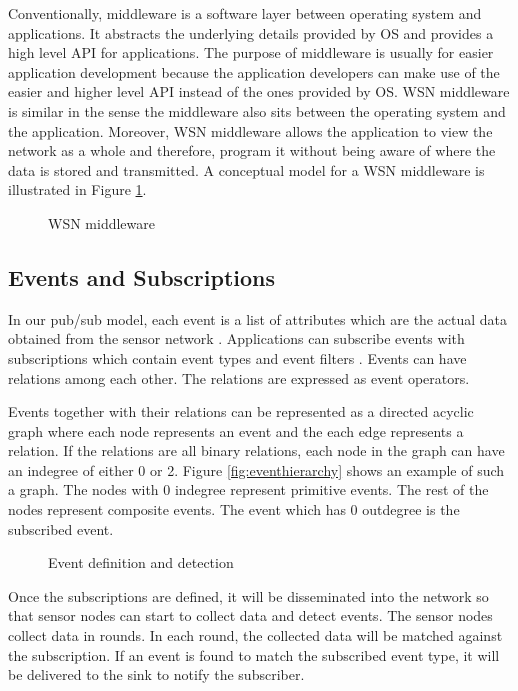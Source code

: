 Conventionally, middleware is a software layer between operating system and applications. It abstracts the underlying details provided by OS and provides a high level API for applications. The purpose of middleware is usually for easier application development because the application developers can make use of the easier and higher level API instead of the ones provided by OS. WSN middleware is similar in the sense the middleware also sits between the operating system and the application. Moreover, WSN middleware allows the application to view the network as a whole and therefore, program it without being aware of where the data is stored and transmitted. A conceptual model for a WSN middleware is illustrated in Figure \ref{fig:middleware}.

\begin{figure}
\centering
{}
\caption{WSN middleware}
\label{fig:middleware}
\end{figure}

\subsection{Events and Subscriptions}
In our pub/sub model, each event is a list of attributes which are the actual data obtained from the sensor network \cite{lowlevelnaming}. Applications can subscribe events with subscriptions which contain event types \cite{facespubsub} and event filters \cite{siena}. Events can have relations among each other. The relations are expressed as event operators.

Events together with their relations can be represented as a directed acyclic graph where each node represents an event and the each edge represents a relation. If the relations are all binary relations, each node in the graph can have an indegree of either 0 or 2. Figure \ref{fig:eventhierarchy} shows an example of such a graph. The nodes with 0 indegree represent primitive events. The rest of the nodes represent composite events. The event which has 0 outdegree is the subscribed event.

\begin{figure}
\centering
{}
\caption{Event definition and detection}
\label{fig:defndetection}
\end{figure}

Once the subscriptions are defined, it will be disseminated into the network so that sensor nodes can start to collect data and detect events. The sensor nodes collect data in rounds. In each round, the collected data will be matched against the subscription. If an event is found to match the subscribed event type, it will be delivered to the sink to notify the subscriber.

